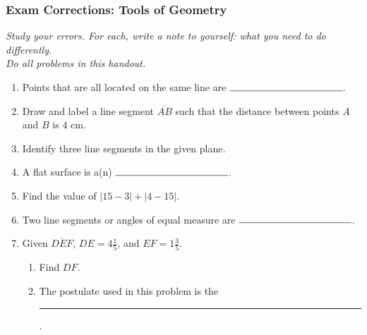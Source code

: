 \documentclass[12pt, twoside]{article}
\begin{document}
  \subsubsection*{Exam Corrections: Tools of Geometry}
  \emph{Study your errors. For each, write a note to yourself: what you need to do differently.\\ Do all problems in this handout.}
    \vspace{0.5cm}
    \begin{enumerate}
    \item Points that are all located on the same line are $\rule{4cm}{0.15mm}$.\bigskip


    \item Draw and label a line segment $\overline{AB}$ such that the distance between points $A$ and $B$ is 4 cm. \vspace{2cm}


    \item Identify three line segments in the given plane.\\[0.25in]
       \vspace{1cm}


    \item A flat surface is a(n) $\rule{4cm}{0.15mm}$. \bigskip

    \item Find the value of $|15-3|+|4-15|$. \bigskip

    \item Two line segments or angles of equal measure are $\rule{4cm}{0.15mm}$.
      \bigskip

    \item Given $\overline{DEF}$, $DE=4 \frac{1}{5}$, and $EF=1 \frac{3}{5}$.
    \begin{enumerate}
      \item Find ${DF}$.\\[.5in]
         \bigskip
      \item The postulate used in this problem is the \rule{6cm}{0.15mm}.
    \end{enumerate}


\end{enumerate}
\end{document}
